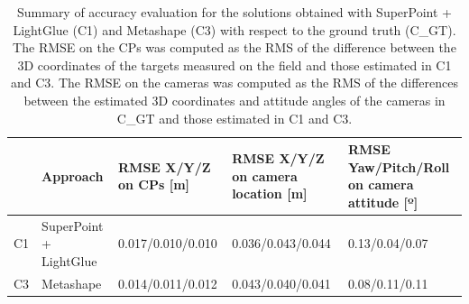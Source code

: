 \begin{table}[ht]
    \centering
    \caption{Summary of accuracy evaluation for the solutions obtained with SuperPoint + LightGlue (C1) and Metashape (C3) with respect to the ground truth (C\_GT). The RMSE on the CPs was computed as the RMS of the difference between the 3D coordinates of the targets measured on the field and those estimated in C1 and C3. The RMSE on the cameras was computed as the RMS of the differences between the estimated 3D coordinates and attitude angles of the cameras in C\_GT and those estimated in C1 and C3.} 
    \label{tab:5:castle_eo_stats}

    \begin{tabular}{l p{2cm} p{3.5cm} p{3.5cm} p{3.5cm}} 
    \toprule
    & Approach & RMSE X/Y/Z \newline on CPs [m] & RMSE X/Y/Z \newline on camera location [m] & RMSE Yaw/Pitch/Roll \newline on camera attitude [º] \\ 
     \midrule
    C1 & SuperPoint + LightGlue & 0.017/0.010/0.010 & 0.036/0.043/0.044 & 0.13/0.04/0.07 \\
    C3 & Metashape & 0.014/0.011/0.012 & 0.043/0.040/0.041 & 0.08/0.11/0.11 \\   
    \bottomrule
    \end{tabular}
\end{table}



 
